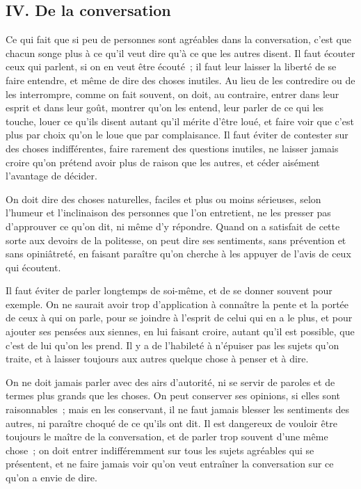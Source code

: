 \documentclass[french,twoside]{book} %
\begin{document}
\subsection[{IV. De la conversation}]{IV. De la conversation}
\noindent Ce qui fait que si peu de personnes sont agréables dans la conversation, c’est que chacun songe plus à ce qu’il veut dire qu’à ce que les autres disent. Il faut écouter ceux qui parlent, si on en veut être écouté ; il faut leur laisser la liberté de se faire entendre, et même de dire des choses inutiles. Au lieu de les contredire ou de les interrompre, comme on fait souvent, on doit, au contraire, entrer dans leur esprit et dans leur goût, montrer qu’on les entend, leur parler de ce qui les touche, louer ce qu’ils disent autant qu’il mérite d’être loué, et faire voir que c’est plus par choix qu’on le loue que par complaisance. Il faut éviter de contester sur des choses indifférentes, faire rarement des questions inutiles, ne laisser jamais croire qu’on prétend avoir plus de raison que les autres, et céder aisément l’avantage de décider.\par
On doit dire des choses naturelles, faciles et plus ou moins sérieuses, selon l’humeur et l’inclinaison des personnes que l’on entretient, ne les presser pas d’approuver ce qu’on dit, ni même d’y répondre. Quand on a satisfait de cette sorte aux devoirs de la politesse, on peut dire ses sentiments, sans prévention et sans opiniâtreté, en faisant paraître qu’on cherche à les appuyer de l’avis de ceux qui écoutent.\par
Il faut éviter de parler longtemps de soi-même, et de se donner souvent pour exemple. On ne saurait avoir trop d’application à connaître la pente et la portée de ceux à qui on parle, pour se joindre à l’esprit de celui qui en a le plus, et pour ajouter ses pensées aux siennes, en lui faisant croire, autant qu’il est possible, que c’est de lui qu’on les prend. Il y a de l’habileté à n’épuiser pas les sujets qu’on traite, et à laisser toujours aux autres quelque chose à penser et à dire.\par
On ne doit jamais parler avec des airs d’autorité, ni se servir de paroles et de termes plus grands que les choses. On peut conserver ses opinions, si elles sont raisonnables ; mais en les conservant, il ne faut jamais blesser les sentiments des autres, ni paraître choqué de ce qu’ils ont dit. Il est dangereux de vouloir être toujours le maître de la conversation, et de parler trop souvent d’une même chose ; on doit entrer indifféremment sur tous les sujets agréables qui se présentent, et ne faire jamais voir qu’on veut entraîner la conversation sur ce qu’on a envie de dire.\par
\end{document}
